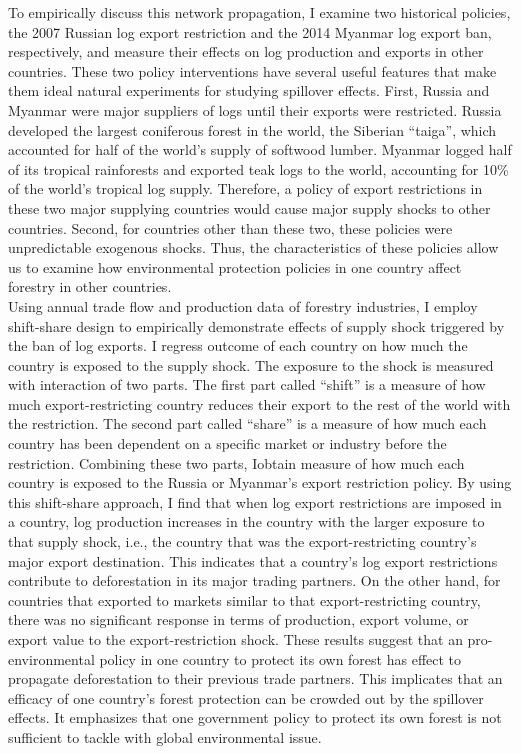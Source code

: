 \documentclass[a4paper,12pt]{article}
\begin{document}
To empirically discuss this network propagation, I examine two historical policies, the 2007 Russian log export restriction and the 2014 Myanmar log export ban, respectively, and measure their effects on log production and exports in other countries. These two policy interventions have several useful features that make them ideal natural experiments for studying spillover effects. First, Russia and Myanmar were major suppliers of logs until their exports were restricted. Russia developed the largest coniferous forest in the world, the Siberian ``taiga'', which accounted for half of the world's supply of softwood lumber. Myanmar logged half of its tropical rainforests and exported teak logs to the world, accounting for 10\% of the world's tropical log supply. Therefore, a policy of export restrictions in these two major supplying countries would cause major supply shocks to other countries. Second, for countries other than these two, these policies were unpredictable exogenous shocks. Thus, the characteristics of these policies allow us to examine how environmental protection policies in one country affect forestry in other countries.\\

Using annual trade flow and production data of forestry industries, I employ shift-share design to empirically demonstrate effects of supply shock triggered by the ban of log exports. I regress outcome of each country on how much the country is exposed to the supply shock. The exposure to the shock is measured with interaction of two parts. The first part called ``shift'' is a measure of how much export-restricting country reduces their export to the rest of the world with the restriction. The second part called ``share'' is a measure of how much each country has been dependent on a specific market or industry before the restriction. Combining these two parts, Iobtain measure of how much each country is exposed to the Russia or Myanmar's export restriction policy. By using this shift-share approach, I find that when log export restrictions are imposed in a country, log production increases in the country with the larger exposure to that supply shock, i.e., the country that was the export-restricting country's major export destination. This indicates that a country's log export restrictions contribute to deforestation in its major trading partners. On the other hand, for countries that exported to markets similar to that export-restricting country, there was no significant response in terms of production, export volume, or export value to the export-restriction shock. These results suggest that an pro-environmental policy in one country to protect its own forest has effect to propagate deforestation to their previous trade partners. This implicates that an efficacy of one country's forest protection can be crowded out by the spillover effects. It emphasizes that one government policy to protect its own forest is not sufficient to tackle with global environmental issue.\\
\end{document}
